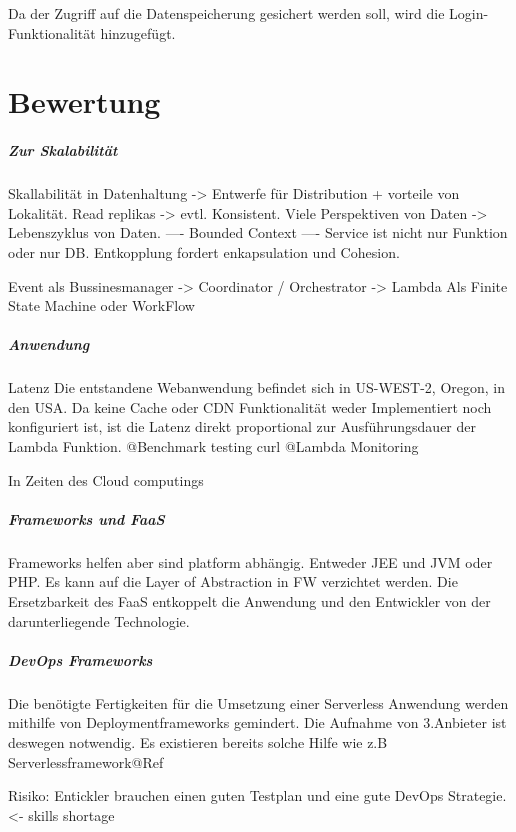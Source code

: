 \documentclass[
12pt,
english,
ngerman,
headsepline,
twoside,
openright,
numbers=noenddot,version=first
]{scrreprt}
\begin{document}
Da der Zugriff auf die Datenspeicherung gesichert werden soll, wird die Login-Funktionalität hinzugefügt.


\chapter{Bewertung}

\paragraph{Zur Skalabilität}
Skallabilität in Datenhaltung -> Entwerfe für Distribution + vorteile von Lokalität.
Read replikas -> evtl. Konsistent. 
Viele Perspektiven von Daten -> Lebenszyklus von Daten. 
---- Bounded Context ---- 
Service ist nicht nur Funktion oder nur DB.
Entkopplung fordert enkapsulation und Cohesion.

Event als Bussinesmanager -> Coordinator / Orchestrator -> Lambda
Als Finite State Machine oder WorkFlow

\paragraph{Anwendung}{Latenz}
Die entstandene Webanwendung befindet sich in US-WEST-2, Oregon, in den USA. 
Da keine Cache oder CDN Funktionalität weder Implementiert noch konfiguriert ist, ist die Latenz direkt proportional zur Ausführungsdauer der Lambda Funktion.
@Benchmark testing curl 
@Lambda Monitoring

In Zeiten des Cloud computings 
\paragraph{Frameworks und FaaS}
Frameworks helfen aber sind platform abhängig. Entweder JEE und JVM oder PHP.
Es kann auf die Layer of Abstraction in FW verzichtet werden. 
Die Ersetzbarkeit des FaaS entkoppelt die Anwendung und den Entwickler von der darunterliegende Technologie.

\paragraph{DevOps Frameworks}
Die benötigte Fertigkeiten für die Umsetzung einer Serverless Anwendung werden mithilfe von Deploymentframeworks gemindert. Die Aufnahme von 3.Anbieter ist deswegen notwendig. Es existieren bereits solche Hilfe wie z.B Serverlessframework@Ref

Risiko:
Entickler brauchen einen guten Testplan und eine gute DevOps Strategie.<- skills shortage
\end{document}
